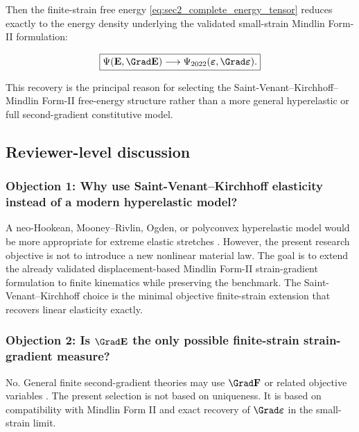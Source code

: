 \documentclass[11pt]{article}
\begin{document}
Then the finite-strain free energy \eqref{eq:sec2_complete_energy_tensor} reduces exactly to the energy density underlying the validated small-strain Mindlin Form-II formulation:

\begin{equation}
\boxed{
\Psi(\mathbf{E},\Grad\mathbf{E})
\longrightarrow
\Psi_{\mathrm{2022}}(\bm{\varepsilon},\Grad\bm{\varepsilon}).
}
\label{eq:sec2_2022_benchmark_recovery}
\end{equation}

This recovery is the principal reason for selecting the Saint-Venant--Kirchhoff--Mindlin Form-II free-energy structure rather than a more general hyperelastic or full second-gradient constitutive model.

\subsection{Reviewer-level discussion}

\subsubsection*{Objection 1: Why use Saint-Venant--Kirchhoff elasticity instead of a modern hyperelastic model?}

A neo-Hookean, Mooney--Rivlin, Ogden, or polyconvex hyperelastic model would be more appropriate for extreme elastic stretches \cite{Rivlin1948,Ogden1997,Ball1976}. However, the present research objective is not to introduce a new nonlinear material law. The goal is to extend the already validated displacement-based Mindlin Form-II strain-gradient formulation to finite kinematics while preserving the benchmark. The Saint-Venant--Kirchhoff choice is the minimal objective finite-strain extension that recovers linear elasticity exactly.

\subsubsection*{Objection 2: Is $\Grad\mathbf{E}$ the only possible finite-strain strain-gradient measure?}

No. General finite second-gradient theories may use $\Grad\mathbf{F}$ or related objective variables \cite{Toupin1962,Toupin1964,JaviliDellIsolaSteinmann2013,Bertram2015}. The present selection is not based on uniqueness. It is based on compatibility with Mindlin Form II and exact recovery of $\Grad\bm{\varepsilon}$ in the small-strain limit.
\end{document}
